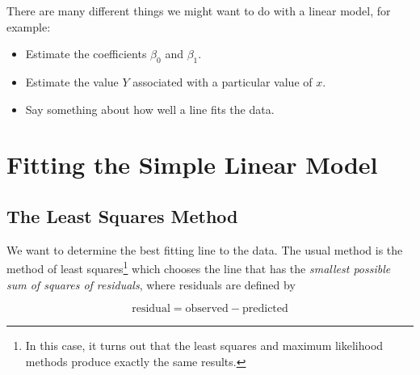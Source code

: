 \documentclass[twoside]{book}
\newcounter{example}[section]
\begin{document}
There are many different things we might want to do with a linear model, for example:
\begin{itemize}
	\item Estimate the coefficients $\beta_0$ and $\beta_1$.
	\item Estimate the value $Y$ associated with a particular value of $x$.
	\item Say something about how well a line fits the data.
\end{itemize}

\section{Fitting the Simple Linear Model}

\subsection{The Least Squares Method}

We want to determine the best fitting line to the data.  The usual method is 
the method of least squares\footnote{In this case, it turns out that the least 
squares and maximum likelihood methods produce exactly the same results.}
which chooses the line that has the 
\emph{ smallest possible sum of squares of residuals}, where residuals are defined by

\[
\mbox{residual} = \mbox{observed} - \mbox{predicted}
\]
\end{document}
